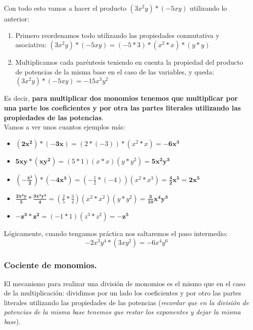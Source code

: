 \documentclass[a4paper,11pt,answers]{exam}
\begin{document}
  Con todo esto vamos a hacer el producto $(3x^2 y)* (-5xy)$ utilizando lo anterior:
  \begin{enumerate}
  \item Primero reordenamos todo utilizando las propiedades conmutativa y asociativa: $(3x^2 y)* (-5xy) = (-5*3)*(x^2 *x)*(y*y)$
  \item Multiplicamos cada paréntesis teniendo en cuenta la propiedad del producto de potencias de la misma base en el caso de las variables, y queda: $(3x^2 y)* (-5xy) = -15 x^3 y^2$
  \end{enumerate}
  Es decir, \textbf{para multiplicar dos monomios tenemos que multiplicar por una parte los coeficientes y por otra las partes literales utilizando las propiedades de las potencias}.\\

  Vamos a ver unos cuantos ejemplos más:
  \begin{solution}
    \begin{itemize}
    \item $\boldsymbol{(2x^2) * (-3x)} = (2*(-3))*(x^2 * x) = \boldsymbol{-6x^3}$
    \item $\boldsymbol{5xy*(xy^2)} = (5*1)(x*x)(y*y^2) = \boldsymbol{5x^2y^3}$
    \item $\boldsymbol{\left(-\frac{x^2}{2}\right) *(-4 x^3)} = \left(-\frac{1}{2} * (-4) \right) (x^2*x^3) = \boldsymbol{\frac{4}{2}x^5 = 2x^5}$
    \item $\boldsymbol{\frac{2x^2y}{5}*\frac{3x^2 y^2}{4}} = \left(\frac{2}{5}*\frac{3}{4}\right)(x^2*x^2)(y*y^2) = 
      \boldsymbol{\frac{3}{10}x^4y^3}$
    \item $\boldsymbol{-z^3*z^2} = (-1*1)(z^3 *z^2) = \boldsymbol{-z^5}$
    \end{itemize}
  \end{solution}
  Lógicamente, cuando tengamos práctica nos saltaremos el paso intermedio: \[-2x^3y^4 *(3 x y^2) = -6 x^4y^6\]

  \subsubsection{Cociente de monomios.}
  El mecanismo para realizar una división de monomios es el mismo que en el caso de la multiplicación: dividimos por un lado los coeficientes y por otro las partes literales utilizando las propiedades de las potencias (\emph{recordar que en la división de potencias de la misma base tenemos que restar los exponentes y dejar la misma base}).\\
\end{document}
